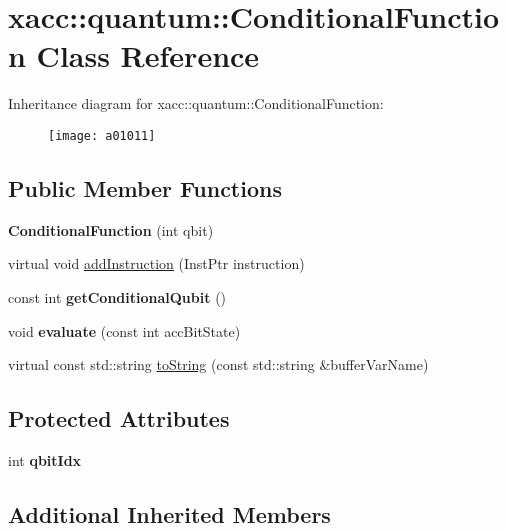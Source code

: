 \hypertarget{a01011}{}\section{xacc\+:\+:quantum\+:\+:Conditional\+Function Class Reference}
\label{a01011}
Inheritance diagram for xacc\+:\+:quantum\+:\+:Conditional\+Function\+:\begin{figure}[H]
\begin{center}
\leavevmode
\texttt{[image: a01011]}
\end{center}
\end{figure}
\subsection*{Public Member Functions}
\begin{DoxyCompactItemize}
\item 
\mbox{\label{a01011_aa28610a08ae04d62ccdd8359433100c3}} 
{\bfseries Conditional\+Function} (int qbit)
\item 
virtual void \hyperlink{a01011_a6aedad20f96390880efdc0a476b3273f}{add\+Instruction} (Inst\+Ptr instruction)
\item 
\mbox{\label{a01011_a804317333b6677a041a3071b5108c0df}} 
const int {\bfseries get\+Conditional\+Qubit} ()
\item 
\mbox{\label{a01011_a709c236a5beb62d9a3bd5265196fb6c9}} 
void {\bfseries evaluate} (const int acc\+Bit\+State)
\item 
virtual const std\+::string \hyperlink{a01011_aca7a5f849fece6fc28a904efee9a3370}{to\+String} (const std\+::string \&buffer\+Var\+Name)
\end{DoxyCompactItemize}
\subsection*{Protected Attributes}
\begin{DoxyCompactItemize}
\item 
\mbox{\label{a01011_a0310536801417c0eded28a4dea1efa44}} 
int {\bfseries qbit\+Idx}
\end{DoxyCompactItemize}
\subsection*{Additional Inherited Members}


